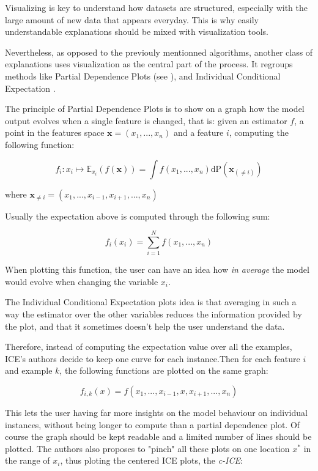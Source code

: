 \documentclass[a4paper,11pt]{kth-mag}
\begin{document}
Visualizing is key to understand how datasets are structured, especially with the large amount of new data that appears everyday. This is why easily understandable explanations should be mixed with visualization tools.

Nevertheless, as opposed to the previouly mentionned algorithms, another class of explanations uses visualization as the central part of the process. It regroups methods like Partial Dependence Plots (see \cite{elementsofstats}), and Individual Conditional Expectation \cite{ice}.

The principle of Partial Dependence Plots is to show on a graph how the model output evolves when a single feature is changed, that is: given an estimator $f$, a point in the features space $\mathbf{x} = (x_1, ..., x_n)$ and a feature $i$, computing the following function:

\[
	f_i : x_i \mapsto \mathbb{E}_{x_i} (f(\mathbf{x})) = \int f(x_1, ..., x_n) \mathrm{dP}(\mathbf{x}_{(\neq i)})
\]

where $\mathbf{x}_{\neq i} = (x_1, ..., x_{i-1}, x_{i+1}, ..., x_n)$

Usually the expectation above is computed through the following sum:

\[
	f_i(x_i) = \sum_{i=1}^{N} f(x_1,... , x_n)
\]

When plotting this function, the user can have an idea how \textit{in average} the model would evolve when changing the variable $x_i$.

The Individual Conditional Expectation plots idea is that averaging in such a way the estimator over the other variables reduces the information provided by the plot, and that it sometimes doesn't help the user understand the data.

Therefore, instead of computing the expectation value over all the examples, ICE's authors decide to keep one curve for each instance.Then for each feature $i$ and example $k$, the following functions are plotted on the same graph:

\[
	f_{i,k}(x) = f(x_1, ..., x_{i-1}, x, x_{i+1}, ..., x_n)
\]

This lets the user having far more insights on the model behaviour on individual instances, without being longer to compute than a partial dependence plot. Of course the graph should be kept readable and a limited number of lines should be plotted. The authors also proposes to "pinch" all these plots on one location $x^*$ in the range of $x_i$, thus ploting the centered ICE plots, the \textit{c-ICE}:
\end{document}
